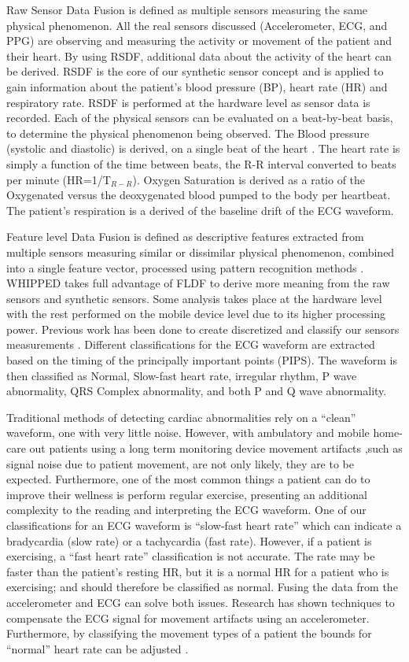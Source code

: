 Raw Sensor Data Fusion is defined as multiple sensors measuring the same physical phenomenon. All the real sensors discussed (Accelerometer, ECG, and PPG) are observing and measuring the activity or movement of the patient and their heart. By using RSDF, additional data about the activity of the heart can be derived. RSDF is the core of our synthetic sensor concept and is applied to gain information about the patient's blood pressure (BP), heart rate (HR) and respiratory rate. RSDF is performed at the hardware level as sensor data is recorded. Each of the physical sensors can be evaluated on a beat-by-beat basis, to determine the physical phenomenon being observed. The Blood pressure (systolic and diastolic) is derived, on a single beat of the heart \cite{Poon2005}. The heart rate is simply a function of the time between beats, the R-R interval converted to beats per minute (HR=1/T$_{R-R}$). Oxygen Saturation is derived as a ratio of the Oxygenated versus the deoxygenated blood pumped to the body per heartbeat. The patient's respiration is a derived of the baseline drift of the ECG waveform. 

Feature level Data Fusion is defined as descriptive features extracted from multiple sensors measuring similar or dissimilar physical phenomenon, combined into a single feature vector,  processed using pattern recognition methods \cite{DaSilva2012}. WHIPPED takes full advantage of FLDF to derive more meaning from the raw sensors and synthetic sensors. Some analysis takes place at the hardware level with the rest performed on the mobile device level due to its higher processing power. Previous work has been done to create discretized and classify our sensors measurements \cite{Chaiyasucheeva2012} \cite{DaSilva2012}. Different classifications for the ECG waveform are extracted based on the timing of the principally important points (PIPS).  The waveform is then classified as Normal, Slow-fast heart rate, irregular rhythm, P wave abnormality, QRS Complex abnormality, and both P and Q wave abnormality. 

Traditional methods of detecting cardiac abnormalities rely on a “clean” waveform, one with very little noise. However, with ambulatory and mobile home-care out patients using a long term monitoring device movement artifacts ,such as signal noise due to patient movement, are not only likely, they are to be expected. Furthermore, one of the most common things a patient can do to improve their wellness is perform regular exercise, presenting an additional complexity to the reading and interpreting the ECG waveform. One of our classifications for an ECG waveform is “slow-fast heart rate” which can indicate a bradycardia (slow rate) or a tachycardia (fast rate). However, if a patient is exercising, a “fast heart rate” classification is not accurate. The rate may be faster than the patient's resting HR, but it is a normal HR for a patient who is exercising; and should therefore be classified as normal. Fusing the data from the accelerometer and ECG can solve both issues. Research has shown techniques to compensate the ECG signal for movement artifacts using an accelerometer. Furthermore, by classifying the movement types of a patient the bounds for “normal” heart rate can be adjusted \cite{Shannon2012}.

